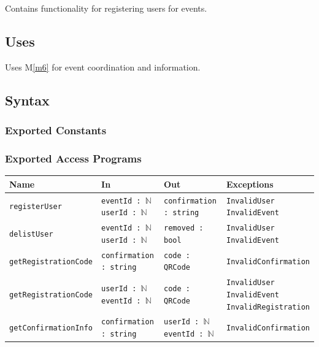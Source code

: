 \documentclass[12pt, titlepage]{article}
\begin{document}
Contains functionality for registering users for events.

\subsection{Uses}
Uses M\ref{m6} for event coordination and information.


\subsection{Syntax}

\subsubsection{Exported Constants}

\subsubsection{Exported Access Programs}
\begin{center}
\begin{tabularx}{\textwidth}{p{10em} X X X}
\hline
\textbf{Name} & \textbf{In} & \textbf{Out} & \textbf{Exceptions} \\
\hline
\texttt{registerUser} &
\parbox[t]{\hsize}{\texttt{eventId : $\mathbb{N}$ \\ userId : $\mathbb{N}$}} &
\texttt{confirmation : string} &
\parbox[t]{\hsize}{\texttt{InvalidUser \\ InvalidEvent}} \\

\texttt{delistUser} &
\parbox[t]{\hsize}{\texttt{eventId : $\mathbb{N}$ \\ userId : $\mathbb{N}$}} &
\texttt{removed : bool} &
\parbox[t]{\hsize}{\texttt{InvalidUser \\ InvalidEvent}} \\

\texttt{getRegistrationCode} &
\texttt{confirmation : string} &
\texttt{code : QRCode} &
\texttt{InvalidConfirmation} \\

\texttt{getRegistrationCode} &
\parbox[t]{\hsize}{\texttt{userId : $\mathbb{N}$ \\ eventId : $\mathbb{N}$}} &
\texttt{code : QRCode} &
\parbox[t]{\hsize}{\texttt{InvalidUser \\ InvalidEvent \\ InvalidRegistration}} \\
\texttt{getConfirmationInfo} &
\texttt{confirmation : string} &
\parbox[t]{\hsize}{\texttt{userId : $\mathbb{N}$ \\ eventId : $\mathbb{N}$}} &
\texttt{InvalidConfirmation} \\
\hline
\end{tabularx}
\end{center}
\end{document}

